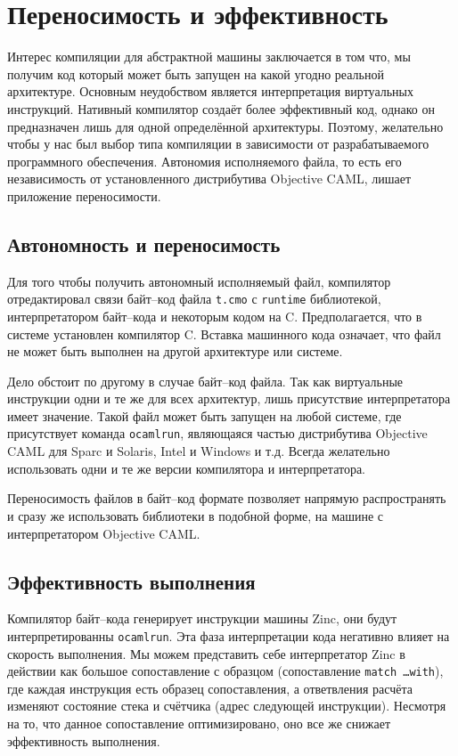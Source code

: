 \section{Переносимость и эффективность}
\label{sec:portability_and_efficiency}

Интерес компиляции для абстрактной машины заключается в том что, мы получим код
который может быть запущен на какой угодно реальной архитектуре. Основным
неудобством является интерпретация виртуальных инструкций. Нативный компилятор
создаёт более эффективный код, однако он предназначен лишь для одной
определённой архитектуры. Поэтому, желательно чтобы у нас был выбор типа
компиляции в зависимости от разрабатываемого программного обеспечения. Автономия
исполняемого файла, то есть его независимость от установленного дистрибутива
Objective CAML, лишает приложение переносимости.

\subsection{Автономность и переносимость}

Для того чтобы получить автономный исполняемый файл, компилятор отредактировал
связи байт--код файла \texttt{t.cmo} с \texttt{runtime} библиотекой,
интерпретатором байт--кода и некоторым кодом на C. Предполагается, что в системе
установлен компилятор C. Вставка машинного кода означает, что файл не может быть
выполнен на другой архитектуре или системе.

Дело обстоит по другому в случае байт--код файла. Так как виртуальные инструкции
одни и те же для всех архитектур, лишь присутствие интерпретатора имеет
значение. Такой файл может быть запущен на любой системе, где присутствует
команда \texttt{ocamlrun}, являющаяся частью дистрибутива Objective CAML для
Sparc и Solaris, Intel и Windows и т.д. Всегда желательно использовать одни и те
же версии компилятора и интерпретатора.

Переносимость файлов в байт--код формате позволяет напрямую распространять и
сразу же использовать библиотеки в подобной форме, на машине с интерпретатором
Objective CAML.

\subsection{Эффективность выполнения}

Компилятор байт--кода генерирует инструкции машины Zinc, они будут
интерпретированны \texttt{ocamlrun}. Эта фаза интерпретации кода негативно
влияет на скорость выполнения. Мы можем представить себе интерпретатор Zinc в
действии как большое сопоставление с образцом (сопоставление \texttt{match
\ldots with}), где каждая инструкция есть образец сопоставления, а ответвления
расчёта изменяют состояние стека и счётчика (адрес следующей инструкции).
Несмотря на то, что данное сопоставление оптимизировано, оно все же снижает
эффективность выполнения.

